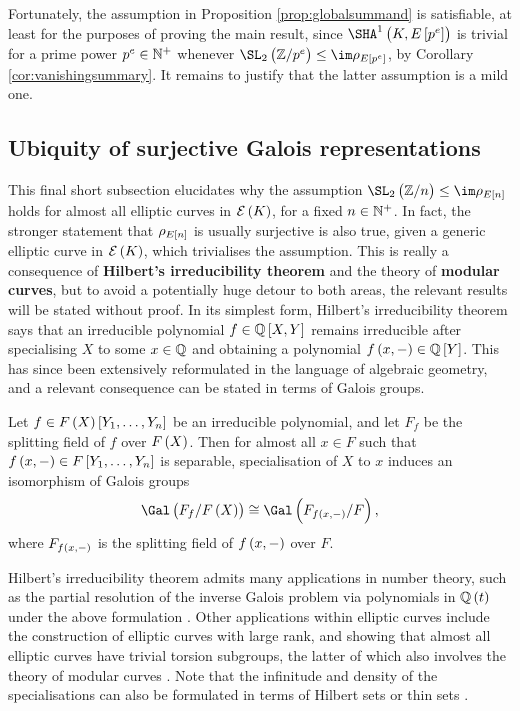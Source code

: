 Fortunately, the assumption in Proposition \ref{prop:globalsummand} is satisfiable, at least for the purposes of proving the main result, since $ \Sha[K, E\sbr{p^e}] $ is trivial for a prime power $ p^e \in \mathbb{N}^+ $ whenever $ \SL_2\br{\ZZ / p^e} \le \im \rho_{E\sbr{p^e}} $, by Corollary \ref{cor:vanishingsummary}. It remains to justify that the latter assumption is a mild one.

\subsection{Ubiquity of surjective Galois representations}

This final short subsection elucidates why the assumption $ \SL_2\br{\ZZ / n} \le \im \rho_{E\sbr{n}} $ holds for almost all elliptic curves in $ \EEE\br{K} $, for a fixed $ n \in \mathbb{N}^+ $. In fact, the stronger statement that $ \rho_{E\sbr{n}} $ is usually surjective is also true, given a generic elliptic curve in $ \EEE\br{K} $, which trivialises the assumption. This is really a consequence of \textbf{Hilbert's irreducibility theorem} and the theory of \textbf{modular curves}, but to avoid a potentially huge detour to both areas, the relevant results will be stated without proof. In its simplest form, Hilbert's irreducibility theorem says that an irreducible polynomial $ f \in \QQ\sbr{X, Y} $ remains irreducible after specialising $ X $ to some $ x \in \mathbb{Q} $ and obtaining a polynomial $ f\br{x, -} \in \QQ\sbr{Y} $. This has since been extensively reformulated in the language of algebraic geometry, and a relevant consequence can be stated in terms of Galois groups.

\begin{theorem}
\label{thm:hilbertirreducibility}
Let $ f \in F\br{X}\sbr{Y_1, \dots, Y_n} $ be an irreducible polynomial, and let $ F_f $ be the splitting field of $ f $ over $ F\br{X} $. Then for almost all $ x \in F $ such that $ f\br{x, -} \in F\sbr{Y_1, \dots, Y_n} $ is separable, specialisation of $ X $ to $ x $ induces an isomorphism of Galois groups
$$ \Gal\br{F_f / F\br{X}} \cong \Gal\br{F_{f\br{x, -}} / F}, $$
where $ F_{f\br{x, -}} $ is the splitting field of $ f\br{x, -} $ over $ F $.
\end{theorem}

\begin{remark}
Hilbert's irreducibility theorem admits many applications in number theory, such as the partial resolution of the inverse Galois problem via polynomials in $ \QQ\br{t} $ under the above formulation \cite[Section 9.3]{Ser89}. Other applications within elliptic curves include the construction of elliptic curves with large rank, and showing that almost all elliptic curves have trivial torsion subgroups, the latter of which also involves the theory of modular curves \cite[Lemma 5.7]{BKLPR15}. Note that the infinitude and density of the specialisations can also be formulated in terms of Hilbert sets or thin sets \cite[Proposition 9.2.2]{Ser89}.
\end{remark}

